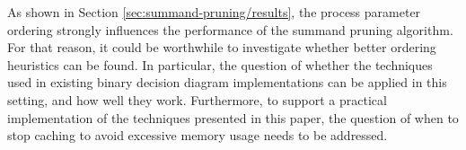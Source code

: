 \documentclass[a4paper]{article}
\begin{document}
As shown in Section \ref{sec:summand-pruning/results}, the process parameter ordering strongly influences the performance of the summand pruning algorithm. For that reason, it could be worthwhile to investigate whether better ordering heuristics can be found. In particular, the question of whether the techniques used in existing binary decision diagram implementations can be applied in this setting, and how well they work. Furthermore, to support a practical implementation of the techniques presented in this paper, the question of when to stop caching to avoid excessive memory usage needs to be addressed.

\appendix


\end{document}
